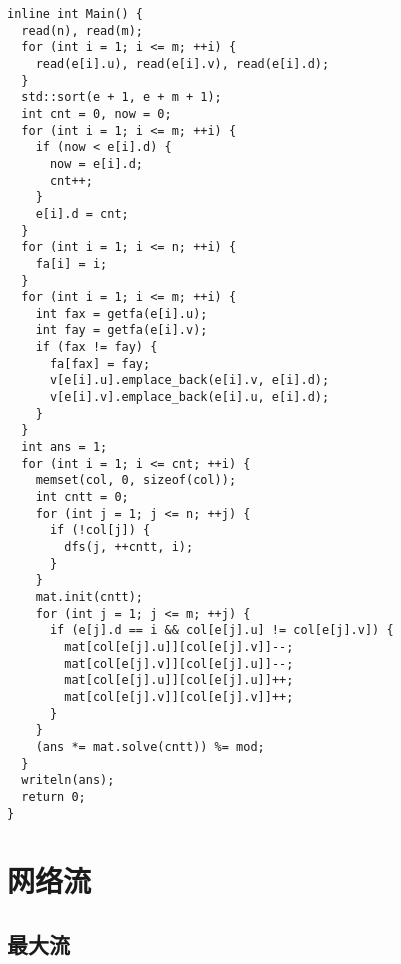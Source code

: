 \documentclass[a4paper,11pt,twoside,fontset = fandol,UTF8]{ctexbook} %
\begin{document}
\begin{lstlisting}
inline int Main() {
  read(n), read(m);
  for (int i = 1; i <= m; ++i) {
    read(e[i].u), read(e[i].v), read(e[i].d);
  }
  std::sort(e + 1, e + m + 1);
  int cnt = 0, now = 0;
  for (int i = 1; i <= m; ++i) {
    if (now < e[i].d) {
      now = e[i].d;
      cnt++;
    }
    e[i].d = cnt;
  }
  for (int i = 1; i <= n; ++i) {
    fa[i] = i;
  }
  for (int i = 1; i <= m; ++i) {
    int fax = getfa(e[i].u);
    int fay = getfa(e[i].v);
    if (fax != fay) {
      fa[fax] = fay;
      v[e[i].u].emplace_back(e[i].v, e[i].d);
      v[e[i].v].emplace_back(e[i].u, e[i].d);
    }
  }
  int ans = 1;
  for (int i = 1; i <= cnt; ++i) {
    memset(col, 0, sizeof(col));
    int cntt = 0;
    for (int j = 1; j <= n; ++j) {
      if (!col[j]) {
        dfs(j, ++cntt, i);
      }
    }
    mat.init(cntt);
    for (int j = 1; j <= m; ++j) {
      if (e[j].d == i && col[e[j].u] != col[e[j].v]) {
        mat[col[e[j].u]][col[e[j].v]]--;
        mat[col[e[j].v]][col[e[j].u]]--;
        mat[col[e[j].u]][col[e[j].u]]++;
        mat[col[e[j].v]][col[e[j].v]]++;
      }
    }
    (ans *= mat.solve(cntt)) %= mod;
  }
  writeln(ans);
  return 0;
}
\end{lstlisting}

\section{网络流}

\subsection{最大流}
\end{document}
